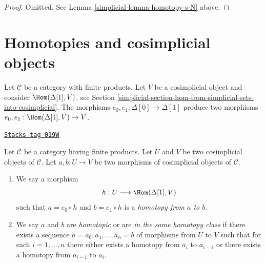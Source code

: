 \begin{proof}

Omitted. See Lemma \ref{simplicial-lemma-homotopy-s-N} above.
\end{proof}

\section{Homotopies and cosimplicial objects}
\label{simplicial-section-homotopy-cosimplicial}
Let $\mathcal{C}$ be a category with finite products. Let $V$ be a
cosimplicial object and consider $\Hom(\Delta[1], V)$, see
Section \ref{simplicial-section-hom-from-simplicial-sets-into-cosimplicial}.
The morphisms $e_0, e_1 : \Delta[0] \to \Delta[1]$
produce two morphisms $e_0, e_1 : \Hom(\Delta[1], V) \to V$.

\begin{definition}
\label{simplicial-definition-homotopy-cosimplicial}
\href{https://stacks.math.columbia.edu/tag/019W}{\texttt{Stacks tag 019W}}

Let $\mathcal{C}$ be a category having finite products.
Let $U$ and $V$ be two cosimplicial objects of $\mathcal{C}$.
Let $a, b : U \to V$ be two morphisms of cosimplicial objects
of $\mathcal{C}$.
\begin{enumerate}
\item We say a morphism
$$
h : U \longrightarrow \Hom(\Delta[1], V)
$$
such that $a = e_0 \circ h$ and $b = e_1 \circ h$ is a
{\it homotopy from $a$ to $b$}.
\item We say $a$ and $b$ are {\it homotopic} or are
{\it in the same homotopy class} if there exists a sequence
$a = a_0, a_1, \ldots, a_n = b$ of morphisms from $U$ to $V$
such that for each $i = 1, \ldots, n$ there either exists a
homotopy from $a_i$ to $a_{i - 1}$ or there exists a homotopy
from $a_{i - 1}$ to $a_i$.
\end{enumerate}
\end{definition}

